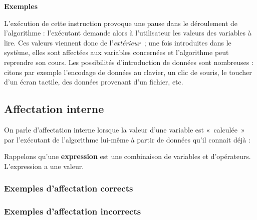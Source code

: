 			{\bfseries Exemples}
			
			
			L’exécution de cette instruction provoque une
			pause dans le déroulement de l’algorithme : l’exécutant demande alors à
			l’utilisateur les valeurs des variables à lire. Ces valeurs viennent
			donc de l’\textit{extérieur~}; une fois introduites dans le système,
			elles sont affectées aux variables concernées et l’algorithme peut
			reprendre son cours. 
			Les possibilités d'introduction de données 
			sont nombreuses : citons par exemple l’encodage de
			données au clavier, un clic de souris, le toucher d'un
			écran tactile, des données provenant d’un fichier, etc.

		\subsection{Affectation interne }

			On parle d’affectation interne lorsque la valeur d’une variable est
			«~calculée~» par l’exécutant de l’algorithme lui-même à partir de
			données qu’il connait déjà :

			
			Rappelons qu’une \textbf{expression} 
			est une combinaison de variables et
			d’opérateurs. L'expression a une valeur.
			
			\subsubsection*{Exemples d'affectation corrects}
			
			
			\subsubsection*{Exemples d'affectation incorrects}
			

